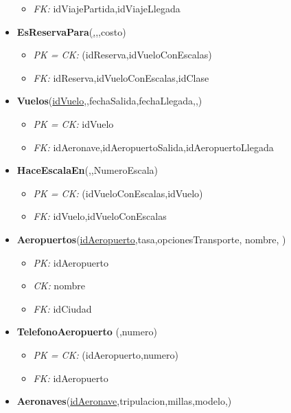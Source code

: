 \begin{itemize}
\begin{itemize}
			\item \textit{FK: } idViajePartida,idViajeLlegada
		\end{itemize}
	\item \textbf{EsReservaPara}(\underline{,},,costo)
		\begin{itemize}
			\item \textit{PK = CK: } (idReserva,idVueloConEscalas)
			\item \textit{FK: } idReserva,idVueloConEscalas,idClase
		\end{itemize}
	\item \textbf{Vuelos}(\underline{idVuelo},,fechaSalida,fechaLlegada,,)
		\begin{itemize}
			\item \textit{PK = CK:} idVuelo
			\item \textit{FK: } idAeronave,idAeropuertoSalida,idAeropuertoLlegada
		\end{itemize}
	\item \textbf{HaceEscalaEn}(\underline{,},NumeroEscala)
		\begin{itemize}
			\item \textit{PK = CK:} (idVueloConEscalas,idVuelo)
			\item \textit{FK: } idVuelo,idVueloConEscalas
		\end{itemize}
	\item \textbf{Aeropuertos}(\underline{idAeropuerto},tasa,opcionesTransporte, nombre, )
		\begin{itemize}
			\item \textit{PK: } idAeropuerto
			\item \textit{CK: } nombre
			\item \textit{FK: } idCiudad
		\end{itemize}
	\item \textbf{TelefonoAeropuerto}	(,numero)
		\begin{itemize}
			\item \textit{PK = CK: } (idAeropuerto,numero)
			\item \textit{FK: } idAeropuerto
		\end{itemize}
	\item \textbf{Aeronaves}(\underline{idAeronave},tripulacion,millas,modelo,)
		\begin{itemize}

\end{itemize}
\end{itemize}
